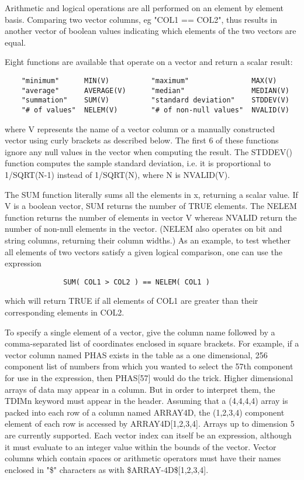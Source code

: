 \documentclass[11pt]{book}
\begin{document}
    Arithmetic and logical operations are all performed on an element by
    element basis.  Comparing two vector columns,  eg  "COL1  ==  COL2",
    thus  results  in  another vector of boolean values indicating which
    elements of the two vectors are equal.

    Eight functions are available that operate on a vector and return a
    scalar result:

\begin{verbatim}
    "minimum"      MIN(V)          "maximum"               MAX(V)
    "average"      AVERAGE(V)      "median"                MEDIAN(V)
    "summation"    SUM(V)          "standard deviation"    STDDEV(V)
    "# of values"  NELEM(V)        "# of non-null values"  NVALID(V)
\end{verbatim}
    where V represents the name of a vector column or a manually
    constructed vector using curly brackets as described below.  The
    first 6 of these functions ignore any null values in the vector when
    computing the result.  The STDDEV() function computes the sample
    standard deviation, i.e. it is proportional to 1/SQRT(N-1) instead
    of 1/SQRT(N), where N is NVALID(V).

    The SUM function literally sums all  the elements in x,  returning a
    scalar value.   If V  is  a  boolean  vector, SUM returns the number
    of TRUE elements. The NELEM function  returns the number of elements
    in vector V whereas NVALID return the number of non-null elements in
    the  vector.   (NELEM  also  operates  on  bit  and string  columns,
    returning their column widths.)  As an example, to  test whether all
    elements of two vectors satisfy a  given logical comparison, one can
    use the expression

\begin{verbatim}
              SUM( COL1 > COL2 ) == NELEM( COL1 )
\end{verbatim}

    which will return TRUE if all elements  of  COL1  are  greater  than
    their corresponding elements in COL2.

    To  specify  a  single  element  of  a  vector, give the column name
    followed by  a  comma-separated  list  of  coordinates  enclosed  in
    square  brackets.  For example, if a vector column named PHAS exists
    in the table as a one dimensional, 256  component  list  of  numbers
    from  which  you  wanted to select the 57th component for use in the
    expression, then PHAS[57] would do the  trick.   Higher  dimensional
    arrays  of  data  may appear in a column.  But in order to interpret
    them, the TDIMn keyword must appear in the header.  Assuming that  a
    (4,4,4,4)  array  is packed into each row of a column named ARRAY4D,
    the  (1,2,3,4)  component  element  of  each  row  is  accessed   by
    ARRAY4D[1,2,3,4].    Arrays   up   to   dimension  5  are  currently
    supported.  Each vector index can itself be an expression,  although
    it  must  evaluate  to  an  integer  value  within the bounds of the
    vector.  Vector columns which contain spaces or arithmetic operators
    must   have   their   names  enclosed  in  "\$"  characters  as  with
    \$ARRAY-4D\$[1,2,3,4].
\end{document}
